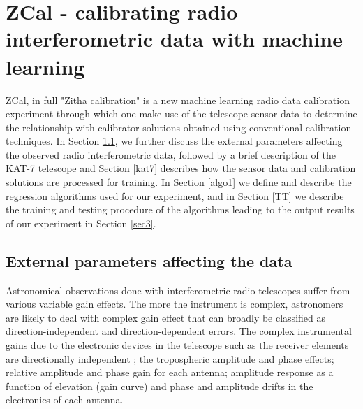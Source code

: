 \chapter{ZCal - calibrating radio interferometric data with machine learning}
\label{c3}
ZCal, in full "Zitha calibration" is a new machine learning radio data calibration experiment through which one make use of the telescope sensor data to determine the relationship with calibrator solutions obtained using conventional calibration techniques. In Section \ref{Exp}, we further discuss the external parameters affecting the observed radio interferometric data, followed by a brief description of the KAT-7 telescope and  Section \ref{kat7} describes how the sensor data and calibration solutions are processed for training. In Section \ref{algo1} we define and describe the regression algorithms used for our experiment, and in Section \ref{TT} we describe the training and testing procedure of the algorithms leading to the output results of our experiment in Section \ref{sec3}. 
\section{External parameters affecting the data}
\label{Exp}

Astronomical observations done with interferometric radio
telescopes suffer from various variable gain effects. The more the instrument is complex,  astronomers are likely to deal with complex gain effect that can
broadly be classified as direction-independent and direction-dependent errors. The complex instrumental gains due to the electronic devices in the telescope such as the receiver elements are directionally independent \citep{bhatnagar2008correcting}; the tropospheric amplitude and phase effects; relative amplitude and phase gain for each antenna; amplitude response as a function of elevation (gain curve) and phase and amplitude drifts in the electronics of each antenna\citep{bhatnagar2008correcting}.

